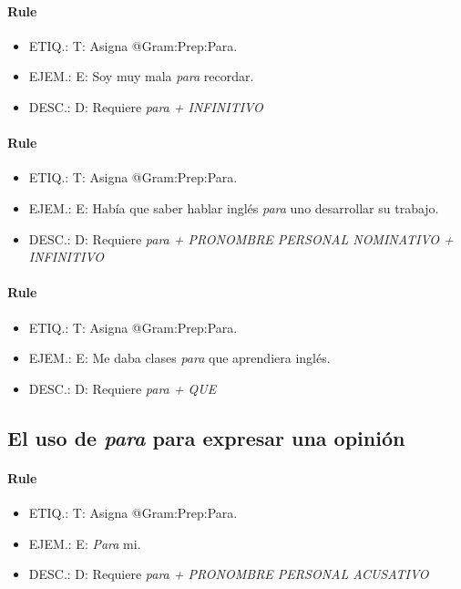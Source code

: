 \documentclass[11pt]{report}
\begin{document}
\paragraph*{Rule}
\begin{itemize}
\item ETIQ.:  T: Asigna @Gram:Prep:Para.
\item EJEM.:  E: Soy muy mala \emph{para} recordar.
\item DESC.:  D: Requiere \emph{para + INFINITIVO}
\end{itemize}

\paragraph*{Rule}
\begin{itemize}
\item ETIQ.:  T: Asigna @Gram:Prep:Para.
\item EJEM.:  E: Había que saber hablar inglés \emph{para} uno desarrollar su trabajo.
\item DESC.:  D: Requiere \emph{para + PRONOMBRE PERSONAL NOMINATIVO + INFINITIVO}
\end{itemize}

\paragraph*{Rule}
\begin{itemize}
\item ETIQ.:  T: Asigna @Gram:Prep:Para.
\item EJEM.:  E: Me daba clases \emph{para} que aprendiera inglés.
\item DESC.:  D: Requiere \emph{para + QUE}
\end{itemize}

\subsection{El uso de \emph{para} para expresar una opinión}
\paragraph*{Rule}
\begin{itemize}
\item ETIQ.:  T: Asigna @Gram:Prep:Para.
\item EJEM.:  E: \emph{Para} mi.
\item DESC.:  D: Requiere \emph{para + PRONOMBRE PERSONAL ACUSATIVO}
\end{itemize}
\end{document}
